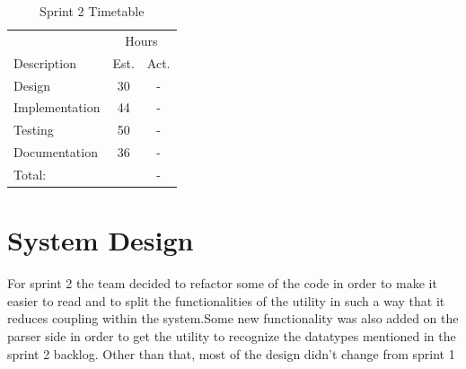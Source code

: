 \begin{table}[!ht] \small \center
\caption{Sprint 2 Timetable\label{tab:sprint2time}}
\begin{tabularx}{\textwidth}{X c c}
	\toprule
	& \multicolumn{2}{c}{Hours} \\
	\cmidrule(r){2-3}
	Description & Est. & Act. \\
	\midrule
	Design & 30 & -\\
	\addlinespace
	Implementation & 44 & - \\
	\addlinespace
	Testing & 50 & -\\
	\addlinespace
	Documentation & 36 & -\\
	\midrule
	Total: &  & - \\
	\bottomrule
\end{tabularx}
\end{table}



\section{System Design}
For sprint 2 the team decided to refactor some of the code in order to make it easier to read and to split the functionalities of the utility in such a way that it reduces coupling within the system.Some new functionality was also added on the parser side in order to get the utility to recognize the datatypes mentioned in the sprint 2 backlog. Other than that, most of the design didn't change from sprint 1

